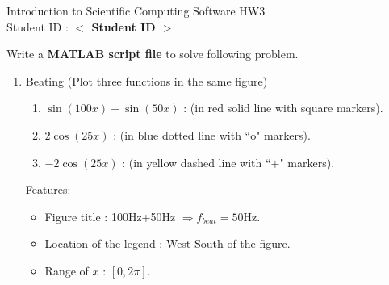 \documentclass[12pt,a4paper]{article}
\newcommand{\placeholder}[1]{\textbf{$<$ #1 $>$}}
\newcommand{\idnumber}{\placeholder{Student ID}}
\begin{document}
\begin{flushleft}Introduction to Scientific Computing Software HW3
\\Student ID : \idnumber{}\end{flushleft}

Write a \textbf{MATLAB script file} to solve following problem.
\begin{enumerate}
\item Beating (Plot three functions in the same figure)
\begin{enumerate} 
\item $\sin(100x)+\sin(50x)$ : (in red solid line with square markers).

\item $2\cos(25x)$ : (in blue dotted line with ``o" markers).
\item $-2\cos(25x)$ : (in yellow dashed line with ``+" markers).
\end{enumerate}
Features:
\begin{itemize}
\item Figure title : 100Hz+50Hz $\Rightarrow f_{beat}=50$Hz.
\item Location of the legend : West-South of the figure.
\item Range of $x $ : $[0,2\pi]$.
\end{itemize}
\end{enumerate}
\end{document}
